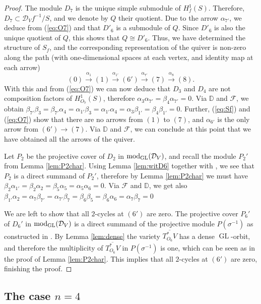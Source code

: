 \documentclass[11pt,reqno]{amsart}
\renewcommand{\a}{\alpha}
\renewcommand{\b}{\beta}
\newcommand{\D}{\mathcal{D}}
\newcommand{\tn}{\textnormal}
\newcommand{\GL}{\operatorname{GL}}
\newcommand{\mc}[1]{\mathcal{#1}}
\newcommand{\ol}[1]{\overline{#1}}
\numberwithin{equation}{section}
\begin{document}
\begin{proof}
The module $D_7$ is the unique simple submodule of $H_f^1(S)$. Therefore, $D_7 \subset \D_V f^{-1}/S$, and we denote by $Q$ their quotient. Due to the arrow $\a_{7'}$, we deduce from (\ref{eq:O7}) and \cite[Lemma 3.11]{lHorincz2019categories} that $D'_6$ is a submodule of $Q$. Since $D'_6$ is also the unique quotient of $Q$, this shows that $Q \cong D'_6$. Thus, we have determined the structure of $S_f$, and the corresponding representation of the quiver is non-zero along the path (with one-dimensional spaces at each vertex, and identity map at each arrow) 
\begin{equation}\label{eq:Sf}
(0) \xrightarrow{\a_1} (1) \xrightarrow{\a_{1'}} (6') \xrightarrow{\a_{7'}} (7) \xrightarrow{\a_8} (8).
\end{equation}
With this and from (\ref{eq:O7}) we can now deduce that $D_3$ and $D_4$ are not composition factors of $H^1_{O_7}(S)$, therefore $\a_3 \a_{7'} = \b_4 \a_{7'} =0$. Via $\mathbb{D}$ and $\mc{F}$, we obtain $\b_{7'} \b_3 = \b_{7'} \a_4 = \a_{1'} \b_3 = \a_{1'} \a_4 = \a_3 \b_{1'} = \b_4 \b_{1'}=0$. Further, (\ref{eq:Sf}) and (\ref{eq:O7}) show that there are no arrows from $(1)$ to $(7)$, and $\a_{6'}$ is the only arrow from $(6') \to (7)$. Via $\mathbb{D}$ and $\mc{F}$, we can conclude at this point that we have obtained all the arrows of the quiver.

Let $P_2$ be the projective cover of $D_2$ in $\tn{mod}_{\GL}(\D_V)$, and recall the module $P_2'$ from Lemma \ref{lem:P2char}. Using Lemma \ref{lem:witD6} together with \cite[Lemma 2.1 and Equation 4.14]{lHorincz2019categories}, we see that $P_2$ is a direct summand of $P_2'$, therefore by Lemma \ref{lem:P2char} we must have $\b_2 \a_{1'}= \b_2\a_2 = \b_5 \a_5=\a_5 \a_6=0$. Via $\mc{F}$ and $\mathbb{D}$, we get also $\b_{1'} \a_2 = \a_7 \b_{7'} = \a_{7'} \b_7=\b_6\b_5=\b_6\a_6=\a_7\b_7=0 $

We are left to show that all $2$-cycles at $(6')$ are zero. The projective cover $P_{6}'$ of $D_6'$ in $\tn{mod}_{\GL}(\D_V)$ is a direct summand of the projective module $P(\sigma^{-1})$ as constructed in \cite[Lemma 2.1]{lHorincz2019categories}. By Lemma \ref{lem:dense} the variety $\ol{T_{O_6}^* V}$ has a dense $\GL$-orbit, and therefore the multiplicity of $\ol{T_{O_6}^* V}$ in $P(\sigma^{-1})$ is one, which can be seen as in the proof of Lemma \ref{lem:P2char}. This implies that all $2$-cycles at $(6')$ are zero, finishing the proof. 
\end{proof}

\subsection{The case $n=4$}\label{sec:n4}
\end{document}
